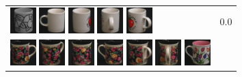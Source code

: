 \begin{figure}[tbp]
\begin{center}
\begin{tabular}{m{11cm} | m{3cm} |}
\includegraphics[width=1cm]{coil/beeld-52.eps} 
\includegraphics[width=1cm]{coil/beeld-37.eps} 
\includegraphics[width=1cm]{coil/beeld-38.eps} 
\includegraphics[width=1cm]{coil/beeld-41.eps} 
\includegraphics[width=1cm]{coil/beeld-40.eps} & {\scriptsize 0.0} \\ 
\includegraphics[width=1cm]{coil/beeld-60.eps} 
\includegraphics[width=1cm]{coil/beeld-63.eps} 
\includegraphics[width=1cm]{coil/beeld-62.eps} 
\includegraphics[width=1cm]{coil/beeld-61.eps} 
\includegraphics[width=1cm]{coil/beeld-64.eps} 
\includegraphics[width=1cm]{coil/beeld-65.eps} 
\includegraphics[width=1cm]{coil/beeld-7.eps} 

\end{tabular}
\end{center}
\end{figure}
